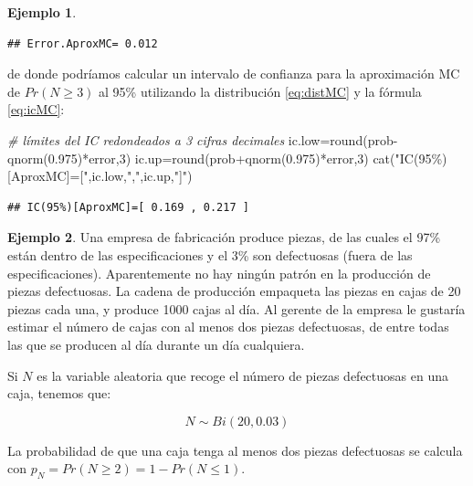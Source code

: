 \documentclass[
]{book}
\newenvironment{Shaded}{\begin{snugshade}}{\end{snugshade}}
\newcommand{\CommentTok}[1]{\textcolor[rgb]{0.56,0.35,0.01}{\textit{#1}}}
\newcommand{\DecValTok}[1]{\textcolor[rgb]{0.00,0.00,0.81}{#1}}
\newcommand{\FloatTok}[1]{\textcolor[rgb]{0.00,0.00,0.81}{#1}}
\newcommand{\FunctionTok}[1]{\textcolor[rgb]{0.00,0.00,0.00}{#1}}
\newcommand{\NormalTok}[1]{#1}
\newcommand{\OtherTok}[1]{\textcolor[rgb]{0.56,0.35,0.01}{#1}}
\newcommand{\SpecialCharTok}[1]{\textcolor[rgb]{0.00,0.00,0.00}{#1}}
\newcommand{\StringTok}[1]{\textcolor[rgb]{0.31,0.60,0.02}{#1}}
\theoremstyle{definition}
\theoremstyle{definition}
\newtheorem{example}{Ejemplo}[chapter]
\theoremstyle{definition}
\theoremstyle{definition}
\theoremstyle{remark}
\begin{document}
\begin{example}
\begin{verbatim}
## Error.AproxMC= 0.012
\end{verbatim}

de donde podríamos calcular un intervalo de confianza para la aproximación MC de \(Pr(N \geq 3)\) al 95\% utilizando la distribución \eqref{eq:distMC} y la fórmula \eqref{eq:icMC}:

\begin{Shaded}
\begin{Highlighting}[]
\CommentTok{\# límites del IC redondeados a 3 cifras decimales}
\NormalTok{ic.low}\OtherTok{=}\FunctionTok{round}\NormalTok{(prob}\SpecialCharTok{{-}}\FunctionTok{qnorm}\NormalTok{(}\FloatTok{0.975}\NormalTok{)}\SpecialCharTok{*}\NormalTok{error,}\DecValTok{3}\NormalTok{)}
\NormalTok{ic.up}\OtherTok{=}\FunctionTok{round}\NormalTok{(prob}\SpecialCharTok{+}\FunctionTok{qnorm}\NormalTok{(}\FloatTok{0.975}\NormalTok{)}\SpecialCharTok{*}\NormalTok{error,}\DecValTok{3}\NormalTok{)}
\FunctionTok{cat}\NormalTok{(}\StringTok{"IC(95\%)[AproxMC]=["}\NormalTok{,ic.low,}\StringTok{","}\NormalTok{,ic.up,}\StringTok{"]"}\NormalTok{)}
\end{Highlighting}
\end{Shaded}

\begin{verbatim}
## IC(95%)[AproxMC]=[ 0.169 , 0.217 ]
\end{verbatim}

\end{example}

\begin{example}
\protect\hypertarget{exm:binom02}{}\label{exm:binom02}Una empresa de fabricación produce piezas, de las cuales el 97\% están dentro de las especiﬁcaciones y el 3\% son defectuosas (fuera de las especiﬁcaciones). Aparentemente no hay ningún patrón en la producción de piezas defectuosas. La cadena de producción empaqueta las piezas en cajas de 20 piezas cada una, y produce 1000 cajas al día. Al gerente de la empresa le gustaría estimar el número de cajas con al menos dos piezas defectuosas, de entre todas las que se producen al día durante un día cualquiera.
\end{example}

Si \(N\) es la variable aleatoria que recoge el número de piezas defectuosas en una caja, tenemos que:

\[N \sim Bi(20, 0.03)\]

La probabilidad de que una caja tenga al menos dos piezas defectuosas se calcula con \(p_N=Pr(N \geq 2)=1-Pr(N\leq 1)\).
\end{document}
